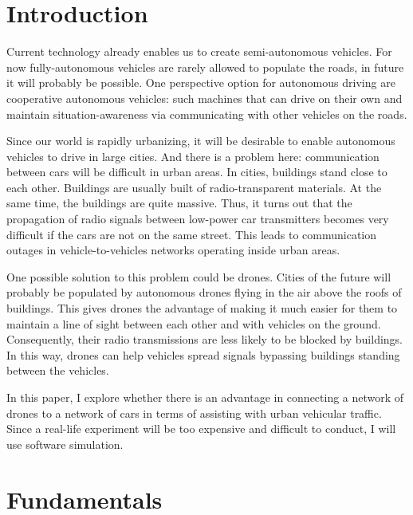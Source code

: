 \documentclass[]{nsm-thesis}
\begin{document}
\cleardoublepage
{}



\chapter{Introduction}
\label{sec:introduction}

Current technology already enables us to create semi-autonomous vehicles. For now fully-autonomous vehicles are rarely allowed to 
populate the roads, in future it will probably be possible. One perspective option for autonomous driving are cooperative autonomous vehicles: such machines
that can drive on their own and maintain situation-awareness via communicating with other vehicles on the roads.

Since our world is rapidly urbanizing, it will be desirable to enable autonomous vehicles to drive in large cities. And there is a problem here: communication between cars will be difficult in urban areas. In cities, buildings stand close to each other. Buildings are usually built of radio-transparent materials. At the same time, the buildings are quite massive. Thus, it turns out that the propagation of radio signals between low-power car transmitters becomes very difficult if the cars are not on the same street. This leads to communication outages in vehicle-to-vehicles networks operating inside urban areas.

One possible solution to this problem could be drones. Cities of the future will probably be populated by autonomous drones flying in the air above the roofs of buildings. This gives drones the advantage of making it much easier for them to maintain a line of sight between each other and with vehicles on the ground. Consequently, their radio transmissions are less likely to be blocked by buildings. In this way, drones can help vehicles spread signals bypassing buildings standing between the vehicles.

In this paper, I explore whether there is an advantage in connecting a network of drones to a network of cars in terms of assisting with urban vehicular traffic.
Since a real-life experiment will be too expensive and difficult to conduct, I will use software simulation.

\chapter{Fundamentals}
\label{sec:fundamentals}
\end{document}
